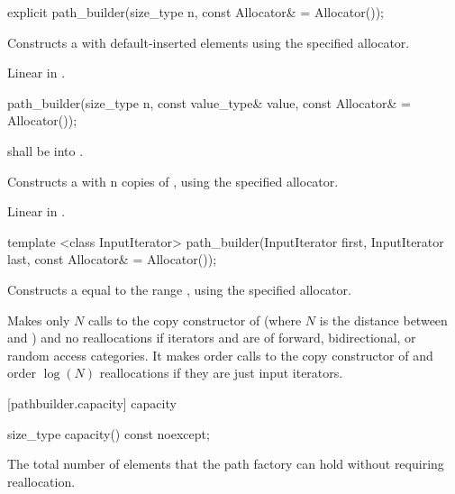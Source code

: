 \begin{itemdecl}
	explicit path_builder(size_type n, const Allocator& = Allocator());
\end{itemdecl}
\begin{itemdescr}
	\pnum
	\effects
	Constructs a  with  default-inserted elements using the specified allocator.
	
	\pnum
	\complexity
	Linear in .
\end{itemdescr}

\begin{itemdecl}
	path_builder(size_type n, const value_type& value,
	  const Allocator& = Allocator());
\end{itemdecl}
\begin{itemdescr}
	\pnum
	\requires
	 shall be  into .
	
	\pnum
	\effects
	Constructs a  with n copies of , using the specified allocator.
	
	\pnum
	\complexity
	Linear in .
\end{itemdescr}

\begin{itemdecl}
	template <class InputIterator>
	path_builder(InputIterator first, InputIterator last,
	  const Allocator& = Allocator());
\end{itemdecl}
\begin{itemdescr}
	\pnum
	\effects
	Constructs a  equal to the range , using the specified allocator.
	
	\pnum
	\complexity
	Makes only $N$ calls to the copy constructor of  (where $N$
	is the distance between
	and
	)
	and no reallocations if iterators  and  are of forward, bidirectional, or random access categories.
	It makes order
	calls to the copy constructor of
	and order
	$\log(N)$
	reallocations if they are just input iterators.
	
\end{itemdescr}

 [pathbuilder.capacity] { capacity}

\begin{itemdecl}
	size_type capacity() const noexcept;
\end{itemdecl}
\begin{itemdescr}
	\pnum
	\returns
	The total number of elements that the path factory can hold without requiring reallocation.
\end{itemdescr}

